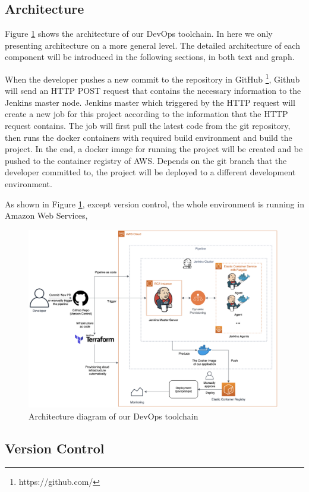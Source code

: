 \subsection{Architecture}
Figure \ref{fig:archjenkins} shows the architecture of our DevOps toolchain. In here we only presenting architecture on a more general level. The detailed architecture of each component will be introduced in the following sections, in both text and graph.
\par
When the developer pushes a new commit to the repository in GitHub \footnote{https://github.com/}, Github will send an HTTP POST request that contains the necessary information to the Jenkins master node. Jenkins master which triggered by the HTTP request will create a new job for this project according to the information that the HTTP request contains. The job will first pull the latest code from the git repository, then runs the docker containers with required build environment and build the project. In the end, a docker image for running the project will be created and be pushed to the container registry of AWS. Depends on the git branch that the developer committed to, the project will be deployed to a different development environment.
\par
As shown in Figure \ref{fig:archjenkins}, except version control, the whole environment is running in Amazon Web Services, 
\begin{figure}[h]
    \centering
    \includegraphics[width=0.99\textwidth]{pics/arch-med-jenkins.png}
    \caption{Architecture diagram of our DevOps toolchain}
    \label{fig:archjenkins}
\end{figure}
\subsection{Version Control}
